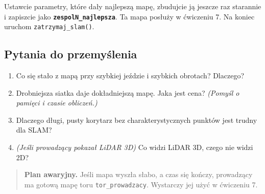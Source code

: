 Ustawcie parametry, które dały najlepszą mapę, zbudujcie ją jeszcze raz starannie i zapiszcie jako \textbf{\texttt{zespolN\_najlepsza}}. Ta mapa posłuży w ćwiczeniu 7. Na koniec uruchom \texttt{zatrzymaj\_slam()}.

\subsection{Pytania do przemyślenia}\label{pytania-do-przemyux15blenia}

\begin{enumerate}
\def\labelenumi{\arabic{enumi}.}
\tightlist
\item
  Co się stało z mapą przy szybkiej jeździe i szybkich obrotach? Dlaczego?
\item
  Drobniejsza siatka daje dokładniejszą mapę. Jaka jest cena? \emph{(Pomyśl o pamięci i czasie obliczeń.)}
\item
  Dlaczego długi, pusty korytarz bez charakterystycznych punktów jest trudny dla SLAM?
\item
  \emph{(Jeśli prowadzący pokazał LiDAR 3D)} Co widzi LiDAR 3D, czego nie widzi 2D?
\end{enumerate}

\begin{quote}
\textbf{Plan awaryjny.} Jeśli mapa wyszła słabo, a czas się kończy, prowadzący ma gotową mapę toru \texttt{tor\_prowadzacy}. Wystarczy jej użyć w ćwiczeniu 7.
\end{quote}
